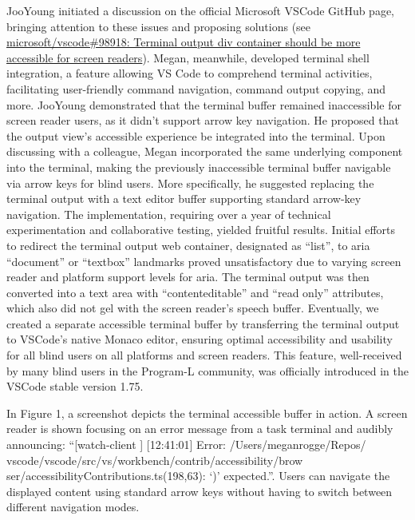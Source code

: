\documentclass[sigconf]{acmart}
\begin{document}
JooYoung initiated a discussion on the official Microsoft VSCode GitHub
page, bringing attention to these issues and proposing solutions (see
\href{https://github.com/microsoft/vscode/issues/98918}{microsoft/vscode\#98918:
Terminal output div container should be more accessible for screen
readers}). Megan, meanwhile, developed terminal shell integration, a
feature allowing VS Code to comprehend terminal activities, facilitating
user-friendly command navigation, command output copying, and more.
JooYoung demonstrated that the terminal buffer remained inaccessible for
screen reader users, as it didn't support arrow key navigation. He
proposed that the output view's accessible experience be integrated into
the terminal. Upon discussing with a colleague, Megan incorporated the
same underlying component into the terminal, making the previously
inaccessible terminal buffer navigable via arrow keys for blind users.
More specifically, he suggested replacing the terminal output with a
text editor buffer supporting standard arrow-key navigation. The
implementation, requiring over a year of technical experimentation and
collaborative testing, yielded fruitful results. Initial efforts to
redirect the terminal output web container, designated as ``list'', to
aria ``document'' or ``textbox'' landmarks proved unsatisfactory due to
varying screen reader and platform support levels for aria. The terminal
output was then converted into a text area with ``contenteditable'' and
``read only'' attributes, which also did not gel with the screen
reader's speech buffer. Eventually, we created a separate accessible
terminal buffer by transferring the terminal output to VSCode's native
Monaco editor, ensuring optimal accessibility and usability for all
blind users on all platforms and screen readers. This feature,
well-received by many blind users in the Program-L community, was
officially introduced in the VSCode stable version 1.75.

In Figure 1, a screenshot depicts the terminal accessible buffer in
action. A screen reader is shown focusing on an error message from a
task terminal and audibly announcing: ``{[}watch-client {]}
{[}12:41:01{]} Error: /Users/meganrogge/Repos/\newline
vscode/vscode/src/vs/workbench/contrib/accessibility/brow\newline
ser/accessibilityContributions.ts(198,63): `)' expected.''. Users can
navigate the displayed content using standard arrow keys without having
to switch between different navigation modes.
\end{document}
